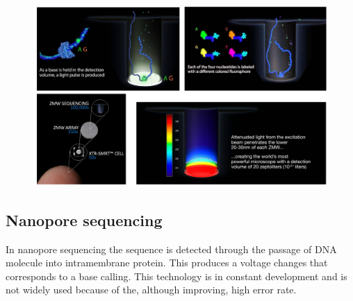     \begin{figure}[H]
    \centering
    \includegraphics[width=1\textwidth]{PacBIO}
    \caption{}
    \label{}
    \end{figure}


\subsection{Nanopore sequencing}
In nanopore sequencing the sequence is detected through the passage of DNA molecule into intramembrane protein.
This produces a voltage changes that corresponds to a base calling.
This technology is in constant development and is not widely used because of the, although improving, high error rate.
